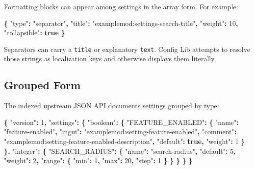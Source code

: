 \documentclass[
  11pt,
  letterpaper,
  titlepage]{article}
\newenvironment{Shaded}{\begin{snugshade}}{\end{snugshade}}
\newcommand{\DataTypeTok}[1]{\textcolor[rgb]{0.13,0.29,0.53}{#1}}
\newcommand{\DecValTok}[1]{\textcolor[rgb]{0.00,0.00,0.81}{#1}}
\newcommand{\FunctionTok}[1]{\textcolor[rgb]{0.13,0.29,0.53}{\textbf{#1}}}
\newcommand{\KeywordTok}[1]{\textcolor[rgb]{0.13,0.29,0.53}{\textbf{#1}}}
\newcommand{\StringTok}[1]{\textcolor[rgb]{0.31,0.60,0.02}{#1}}
\begin{document}
Formatting blocks can appear among settings in the array form. For
example:

\begin{Shaded}
\begin{Highlighting}[]
\FunctionTok{\{}
  \DataTypeTok{"type"}\FunctionTok{:} \StringTok{"separator"}\FunctionTok{,}
  \DataTypeTok{"title"}\FunctionTok{:} \StringTok{"examplemod:settings{-}search{-}title"}\FunctionTok{,}
  \DataTypeTok{"weight"}\FunctionTok{:} \DecValTok{10}\FunctionTok{,}
  \DataTypeTok{"collapsible"}\FunctionTok{:} \KeywordTok{true}
\FunctionTok{\}}
\end{Highlighting}
\end{Shaded}

Separators can carry a \texttt{title} or explanatory \texttt{text}.
Config Lib attempts to resolve those strings as localization keys and
otherwise displays them literally.

\subsection{Grouped Form}\label{grouped-form}

The indexed upstream JSON API documents settings grouped by type:

\begin{Shaded}
\begin{Highlighting}[]
\FunctionTok{\{}
  \DataTypeTok{"version"}\FunctionTok{:} \DecValTok{1}\FunctionTok{,}
  \DataTypeTok{"settings"}\FunctionTok{:} \FunctionTok{\{}
    \DataTypeTok{"boolean"}\FunctionTok{:} \FunctionTok{\{}
      \DataTypeTok{"FEATURE\_ENABLED"}\FunctionTok{:} \FunctionTok{\{}
        \DataTypeTok{"name"}\FunctionTok{:} \StringTok{"feature{-}enabled"}\FunctionTok{,}
        \DataTypeTok{"ingui"}\FunctionTok{:} \StringTok{"examplemod:setting{-}feature{-}enabled"}\FunctionTok{,}
        \DataTypeTok{"comment"}\FunctionTok{:} \StringTok{"examplemod:setting{-}feature{-}enabled{-}description"}\FunctionTok{,}
        \DataTypeTok{"default"}\FunctionTok{:} \KeywordTok{true}\FunctionTok{,}
        \DataTypeTok{"weight"}\FunctionTok{:} \DecValTok{1}
      \FunctionTok{\}}
    \FunctionTok{\},}
    \DataTypeTok{"integer"}\FunctionTok{:} \FunctionTok{\{}
      \DataTypeTok{"SEARCH\_RADIUS"}\FunctionTok{:} \FunctionTok{\{}
        \DataTypeTok{"name"}\FunctionTok{:} \StringTok{"search{-}radius"}\FunctionTok{,}
        \DataTypeTok{"default"}\FunctionTok{:} \DecValTok{5}\FunctionTok{,}
        \DataTypeTok{"weight"}\FunctionTok{:} \DecValTok{2}\FunctionTok{,}
        \DataTypeTok{"range"}\FunctionTok{:} \FunctionTok{\{}
          \DataTypeTok{"min"}\FunctionTok{:} \DecValTok{1}\FunctionTok{,}
          \DataTypeTok{"max"}\FunctionTok{:} \DecValTok{20}\FunctionTok{,}
          \DataTypeTok{"step"}\FunctionTok{:} \DecValTok{1}
        \FunctionTok{\}}
      \FunctionTok{\}}
    \FunctionTok{\}}
  \FunctionTok{\}}
\FunctionTok{\}}
\end{Highlighting}
\end{Shaded}
\end{document}
